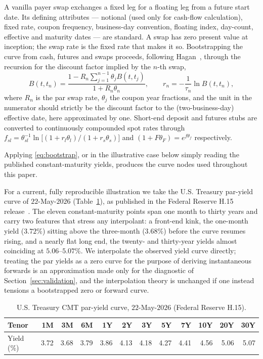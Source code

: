 \documentclass[10pt]{article}
\begin{document}
A vanilla payer swap exchanges a fixed leg for a floating leg from a future start date. Its
defining attributes --- notional (used only for cash-flow calculation), fixed rate, coupon
frequency, business-day convention, floating index, day-count, effective and maturity dates ---
are standard. A swap has zero present value at inception; the swap rate is the fixed rate that
makes it so. Bootstrapping the curve from cash, futures and swaps proceeds, following
Hagan~\cite{Hagan}, through the recursion for the discount factor implied by the $n$-th swap,
\begin{equation}
B(t,t_n)=\frac{1-R_n\sum_{j=1}^{n-1}\theta_j B(t,t_j)}{1+R_n\theta_n},\qquad
r_n=-\frac{1}{\tau_n}\ln B(t,t_n),
\label{eq:bootstrap}
\end{equation}
where $R_n$ is the par swap rate, $\theta_j$ the coupon year fractions, and the unit in the
numerator should strictly be the discount factor to the (two-business-day) effective date,
here approximated by one. Short-end deposit and futures stubs are converted to continuously
compounded spot rates through $f_{sl}=\theta_{sl}^{-1}\ln\big[(1+r_l\theta_l)/(1+r_s\theta_s)\big]$
and $(1+F\theta_F)=e^{f\theta_f}$ respectively.

Applying \eqref{eq:bootstrap}, or in the illustrative case below simply reading the published
constant-maturity yields, produces the curve nodes used throughout this paper.

For a current, fully reproducible illustration we take the U.S. Treasury par-yield curve of
$22$-May-$2026$ (Table~\ref{tab:data}), as published in the Federal Reserve H.15
release~\cite{H15}. The eleven constant-maturity points span one month to thirty years and
carry two features that stress any interpolant: a front-end kink, the one-month yield
($3.72\%$) sitting above the three-month ($3.68\%$) before the curve resumes rising, and a
nearly flat long end, the twenty- and thirty-year yields almost coinciding at $5.06$--$5.07\%$.
We interpolate the observed yield curve directly; treating the par yields as a zero curve for
the purpose of deriving instantaneous forwards is an approximation made only for the diagnostic
of Section~\ref{sec:validation}, and the interpolation theory is unchanged if one instead
tensions a bootstrapped zero or forward curve.

\begin{table}[t]\small\centering
\caption{U.S. Treasury CMT par-yield curve, $22$-May-$2026$ (Federal Reserve H.15).}\label{tab:data}
\begin{tabular}{lrrrrrrrrrrr}
\toprule
Tenor & 1M & 3M & 6M & 1Y & 2Y & 3Y & 5Y & 7Y & 10Y & 20Y & 30Y\\
\midrule
Yield (\%) & 3.72 & 3.68 & 3.79 & 3.86 & 4.13 & 4.18 & 4.27 & 4.41 & 4.56 & 5.06 & 5.07\\
\bottomrule
\end{tabular}
\end{table}
\end{document}
